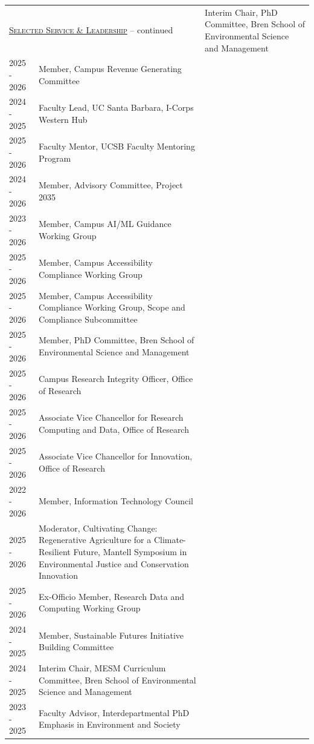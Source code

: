 
\begin{longtable}{l p{5.5in}}

\endfirsthead
\multicolumn{2}{l}{\hspace{.1in} \textsc{\underline{Selected Service \& Leadership}} -- continued
\vspace*{.1in} }  \endhead

2025 - 2026 & Interim Chair, PhD Committee, Bren School of Environmental Science and Management \\
2025 - 2026 & Member, Campus Revenue Generating Committee \\
2024 - 2025 & Faculty Lead, UC Santa Barbara, I-Corps Western Hub \\
2025 - 2026 & Faculty Mentor, UCSB Faculty Mentoring Program \\
2024 - 2026 & Member, Advisory Committee, Project 2035 \\
2023 - 2026 & Member, Campus AI/ML Guidance Working Group \\
2025 - 2026 & Member, Campus Accessibility Compliance Working Group \\
2025 - 2026 & Member, Campus Accessibility Compliance Working Group, Scope and Compliance Subcommittee \\
2025 - 2026 & Member, PhD Committee, Bren School of Environmental Science and Management \\
2025 - 2026 & Campus Research Integrity Officer, Office of Research \\
2025 - 2026 & Associate Vice Chancellor for Research Computing and Data, Office of Research \\
2025 - 2026 & Associate Vice Chancellor for Innovation, Office of Research \\
2022 - 2026 & Member, Information Technology Council \\
2025 - 2026 & Moderator, Cultivating Change: Regenerative Agriculture for a Climate-Resilient Future, Mantell Symposium in Environmental Justice and Conservation Innovation \\
2025 - 2026 & Ex-Officio Member, Research Data and Computing Working Group \\
2024 - 2025 & Member, Sustainable Futures Initiative Building Committee \\
2024 - 2025 & Interim Chair, MESM Curriculum Committee, Bren School of Environmental Science and Management \\
2023 - 2025 & Faculty Advisor, Interdepartmental PhD Emphasis in Environment and Society \\

\end{longtable}
